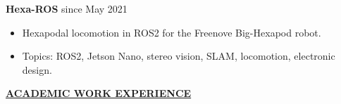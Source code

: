 \documentclass{article}
\begin{document}
\noindent \textbf{Hexa-ROS} \hfill since May 2021
\begin{itemize}[noitemsep,nolistsep,leftmargin=*]
    \item Hexapodal locomotion in ROS2 for the Freenove Big-Hexapod robot.
    \item Topics: ROS2, Jetson Nano, stereo vision, SLAM, locomotion, electronic design.\\
\end{itemize}

% 
%
\noindent \textbf{\underline{ACADEMIC WORK EXPERIENCE}} \\
\end{document}
